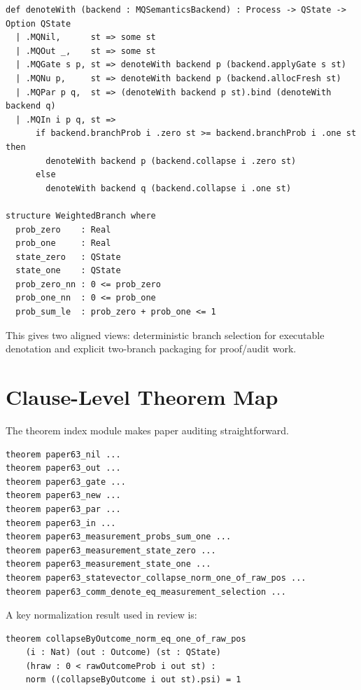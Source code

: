 \documentclass[11pt]{article}
\begin{document}
\begin{lstlisting}[caption={Denotational clauses and weighted measurement view (from \texttt{Denotational.lean})}]
def denoteWith (backend : MQSemanticsBackend) : Process -> QState -> Option QState
  | .MQNil,      st => some st
  | .MQOut _,    st => some st
  | .MQGate s p, st => denoteWith backend p (backend.applyGate s st)
  | .MQNu p,     st => denoteWith backend p (backend.allocFresh st)
  | .MQPar p q,  st => (denoteWith backend p st).bind (denoteWith backend q)
  | .MQIn i p q, st =>
      if backend.branchProb i .zero st >= backend.branchProb i .one st then
        denoteWith backend p (backend.collapse i .zero st)
      else
        denoteWith backend q (backend.collapse i .one st)

structure WeightedBranch where
  prob_zero    : Real
  prob_one     : Real
  state_zero   : QState
  state_one    : QState
  prob_zero_nn : 0 <= prob_zero
  prob_one_nn  : 0 <= prob_one
  prob_sum_le  : prob_zero + prob_one <= 1
\end{lstlisting}

This gives two aligned views: deterministic branch selection for executable denotation and explicit two-branch packaging for proof/audit work.

\section{Clause-Level Theorem Map}
The theorem index module makes paper auditing straightforward.

\begin{lstlisting}[caption={Paper-clause theorem handles (from \texttt{PaperMap.lean})}]
theorem paper63_nil ...
theorem paper63_out ...
theorem paper63_gate ...
theorem paper63_new ...
theorem paper63_par ...
theorem paper63_in ...
theorem paper63_measurement_probs_sum_one ...
theorem paper63_measurement_state_zero ...
theorem paper63_measurement_state_one ...
theorem paper63_statevector_collapse_norm_one_of_raw_pos ...
theorem paper63_comm_denote_eq_measurement_selection ...
\end{lstlisting}

\noindent
A key normalization result used in review is:
\begin{lstlisting}[caption={Post-collapse normalization (from \texttt{Backend.lean})}]
theorem collapseByOutcome_norm_eq_one_of_raw_pos
    (i : Nat) (out : Outcome) (st : QState)
    (hraw : 0 < rawOutcomeProb i out st) :
    norm ((collapseByOutcome i out st).psi) = 1
\end{lstlisting}
\end{document}

